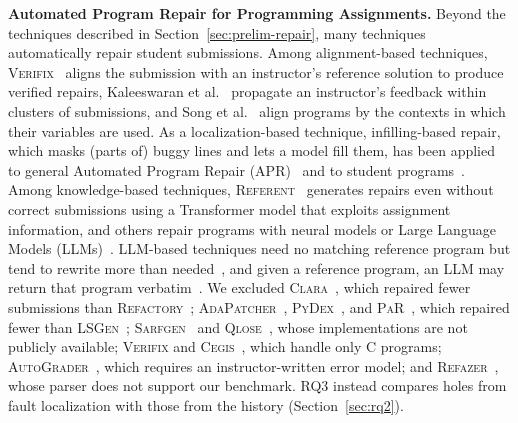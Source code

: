 \documentclass[10pt,conference]{IEEEtran}
\begin{document}
\textbf{Automated Program Repair for Programming Assignments.} Beyond the techniques described in Section~\ref{sec:prelim-repair}, many techniques automatically repair student submissions. Among alignment-based techniques, \textsc{Verifix}~\cite{ahmed2022verifix} aligns the submission with an instructor's reference solution to produce verified repairs, Kaleeswaran et al.~\cite{kaleeswaran2016semi} propagate an instructor's feedback within clusters of submissions, and Song et al.~\cite{song2021context} align programs by the contexts in which their variables are used. As a localization-based technique, infilling-based repair, which masks (parts of) buggy lines and lets a model fill them, has been applied to general Automated Program Repair (APR)~\cite{xia2022less} and to student programs~\cite{koutcheme2023automated}. Among knowledge-based techniques, \textsc{Referent}~\cite{heo2023referent} generates repairs even without correct submissions using a Transformer model that exploits assignment information, and others repair programs with neural models or Large Language Models (LLMs)~\cite{pu2016sk_p, liu2024fastfixer, yang2024cref}. LLM-based techniques need no matching reference program but tend to rewrite more than needed~\cite{orvalho2025counterexample, dai2025less, phung2023generative}, and given a reference program, an LLM may return that program verbatim~\cite{xie2024brafar}. We excluded \textsc{Clara}~\cite{gulwani2018automated}, which repaired fewer submissions than \textsc{Refactory}~\cite{hu2019re}; \textsc{AdaPatcher}~\cite{dai2025less}, \textsc{PyDex}~\cite{zhang2024pydex}, and \textsc{PaR}~\cite{zhao2026peer}, which repaired fewer than \textsc{LSGen}~\cite{dai2026learner}; \textsc{Sarfgen}~\cite{wang2018search} and \textsc{Qlose}~\cite{d2016qlose}, whose implementations are not publicly available; \textsc{Verifix} and \textsc{Cegis}~\cite{orvalho2025counterexample}, which handle only C programs; \textsc{AutoGrader}~\cite{singh2013automated}, which requires an instructor-written error model; and \textsc{Refazer}~\cite{rolim2017learning}, whose parser does not support our benchmark. RQ3 instead compares holes from fault localization with those from the history (Section~\ref{sec:rq2}).
\end{document}
